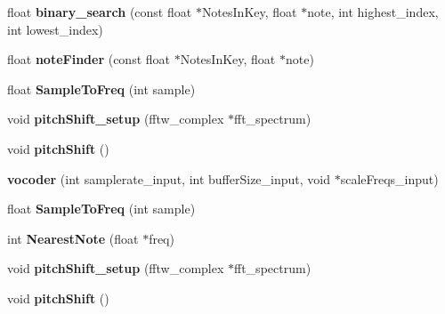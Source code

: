 \begin{DoxyCompactItemize}
\item 
\hypertarget{classvocoder_a7a0b1f788e03878de287d7f6163208a9}{float {\bfseries binary\-\_\-search} (const float $\ast$Notes\-In\-Key, float $\ast$note, int highest\-\_\-index, int lowest\-\_\-index)}\label{classvocoder_a7a0b1f788e03878de287d7f6163208a9}

\item 
\hypertarget{classvocoder_afb731a113935c575939ebdff7ae37580}{float {\bfseries note\-Finder} (const float $\ast$Notes\-In\-Key, float $\ast$note)}\label{classvocoder_afb731a113935c575939ebdff7ae37580}

\item 
\hypertarget{classvocoder_a2b3a6e386d3a18f9366320e5743d33b1}{float {\bfseries Sample\-To\-Freq} (int sample)}\label{classvocoder_a2b3a6e386d3a18f9366320e5743d33b1}

\item 
\hypertarget{classvocoder_aa3d122aee6d6ae77ac5b04572e924dc0}{void {\bfseries pitch\-Shift\-\_\-setup} (fftw\-\_\-complex $\ast$fft\-\_\-spectrum)}\label{classvocoder_aa3d122aee6d6ae77ac5b04572e924dc0}

\item 
\hypertarget{classvocoder_aa218678a51da7429066c32e59edd5057}{void {\bfseries pitch\-Shift} ()}\label{classvocoder_aa218678a51da7429066c32e59edd5057}

\item 
\hypertarget{classvocoder_a759189527108a2f32b992406b8210db8}{{\bfseries vocoder} (int samplerate\-\_\-input, int buffer\-Size\-\_\-input, void $\ast$scale\-Freqs\-\_\-input)}\label{classvocoder_a759189527108a2f32b992406b8210db8}

\item 
\hypertarget{classvocoder_a2b3a6e386d3a18f9366320e5743d33b1}{float {\bfseries Sample\-To\-Freq} (int sample)}\label{classvocoder_a2b3a6e386d3a18f9366320e5743d33b1}

\item 
\hypertarget{classvocoder_a8b1e51e28458338abc0eeaac00c1842f}{int {\bfseries Nearest\-Note} (float $\ast$freq)}\label{classvocoder_a8b1e51e28458338abc0eeaac00c1842f}

\item 
\hypertarget{classvocoder_aa3d122aee6d6ae77ac5b04572e924dc0}{void {\bfseries pitch\-Shift\-\_\-setup} (fftw\-\_\-complex $\ast$fft\-\_\-spectrum)}\label{classvocoder_aa3d122aee6d6ae77ac5b04572e924dc0}

\item 
\hypertarget{classvocoder_aa218678a51da7429066c32e59edd5057}{void {\bfseries pitch\-Shift} ()}\label{classvocoder_aa218678a51da7429066c32e59edd5057}

\end{DoxyCompactItemize}
